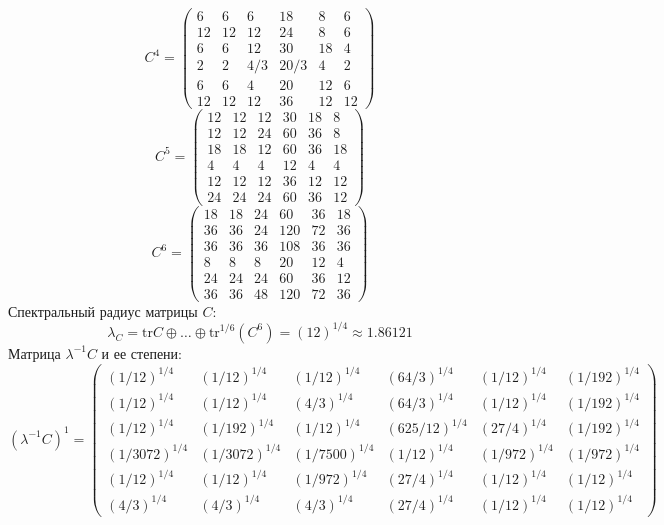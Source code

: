 $$C^4 = \begin{pmatrix}
6 & 6 & 6 & 18 & 8 & 6\\
12 & 12 & 12 & 24 & 8 & 6\\
6 & 6 & 12 & 30 & 18 & 4\\
2 & 2 & 4/3 & 20/3 & 4 & 2\\
6 & 6 & 4 & 20 & 12 & 6\\
12 & 12 & 12 & 36 & 12 & 12
\end{pmatrix}
$$
$$C^5 = \begin{pmatrix}
12 & 12 & 12 & 30 & 18 & 8\\
12 & 12 & 24 & 60 & 36 & 8\\
18 & 18 & 12 & 60 & 36 & 18\\
4 & 4 & 4 & 12 & 4 & 4\\
12 & 12 & 12 & 36 & 12 & 12\\
24 & 24 & 24 & 60 & 36 & 12
\end{pmatrix}
$$
$$C^6 = \begin{pmatrix}
18 & 18 & 24 & 60 & 36 & 18\\
36 & 36 & 24 & 120 & 72 & 36\\
36 & 36 & 36 & 108 & 36 & 36\\
8 & 8 & 8 & 20 & 12 & 4\\
24 & 24 & 24 & 60 & 36 & 12\\
36 & 36 & 48 & 120 & 72 & 36
\end{pmatrix}
$$
Спектральный радиус матрицы $C$:
$$\lambda_{C} = \mathrm{tr}C\oplus \dots \oplus \mathrm{tr}^{1/6}(C^{6}) = (12)^{1/4} \approx 1.86121$$
Матрица $\lambda^{-1}C$ и ее степени:
$$(\lambda^{-1}C)^1 = \begin{pmatrix}
(1/12)^{1/4} & (1/12)^{1/4} & (1/12)^{1/4} & (64/3)^{1/4} & (1/12)^{1/4} & (1/192)^{1/4}\\
(1/12)^{1/4} & (1/12)^{1/4} & (4/3)^{1/4} & (64/3)^{1/4} & (1/12)^{1/4} & (1/192)^{1/4}\\
(1/12)^{1/4} & (1/192)^{1/4} & (1/12)^{1/4} & (625/12)^{1/4} & (27/4)^{1/4} & (1/192)^{1/4}\\
(1/3072)^{1/4} & (1/3072)^{1/4} & (1/7500)^{1/4} & (1/12)^{1/4} & (1/972)^{1/4} & (1/972)^{1/4}\\
(1/12)^{1/4} & (1/12)^{1/4} & (1/972)^{1/4} & (27/4)^{1/4} & (1/12)^{1/4} & (1/12)^{1/4}\\
(4/3)^{1/4} & (4/3)^{1/4} & (4/3)^{1/4} & (27/4)^{1/4} & (1/12)^{1/4} & (1/12)^{1/4}
\end{pmatrix}
$$
